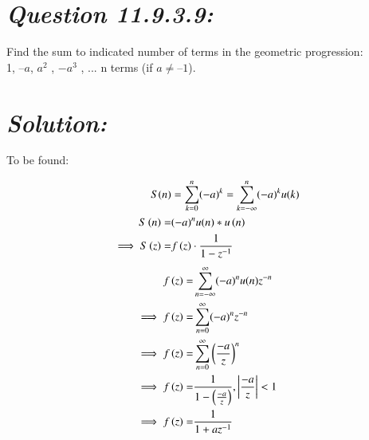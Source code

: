 \documentclass[journal,12pt,twocolumn]{IEEEtran}
\theoremstyle{remark}
\begin{document}



\maketitle

\newpage


\bigskip
 
\renewcommand{\thefigure}{\theenumi}
\renewcommand{\thetable}{\theenumi}
\section*{\textit{\textbf{Question 11.9.3.9:}}}
Find the sum to indicated number of terms in the geometric progression:\\

1, $– a$, $a^2$
, $-a^3$
, ... n terms (if $a \neq – 1$).

\section*{\textit{\textbf{Solution:}}}
To be found:
% 

\begin{align}
S(n) &= \sum_{k=0}^{n} (-a)^k = \sum_{k=-\infty}^{n} (-a)^k u(k) \\
S\left(n\right)= &{(-a)^n}u(n)*u\left(n\right)\\
\implies S\left(z\right)= &f\left(z\right)\cdot\frac{1}{1-z^{-1}}
\end{align}
 \begin{align}
     f\left(z\right)=&\sum_{n=-\infty}^{\infty} (-a)^n u(n) z^{-n}\\
     \implies f\left(z\right)=&\sum_{n=0}^{\infty} (-a)^n z^{-n}\\
    \implies f\left(z\right)=&\sum_{n=0}^{\infty} \left( \frac{-a}{z} \right)^n\\
   \implies  f\left(z\right)=&\frac{1}{1-\left(\frac{-a}{z}\right)},\left| \frac{-a}{z} \right| < 1
 \\
   \implies  f\left(z\right)=&\frac{1}{1+az^{-1}}
\end{align}
\end{document}
